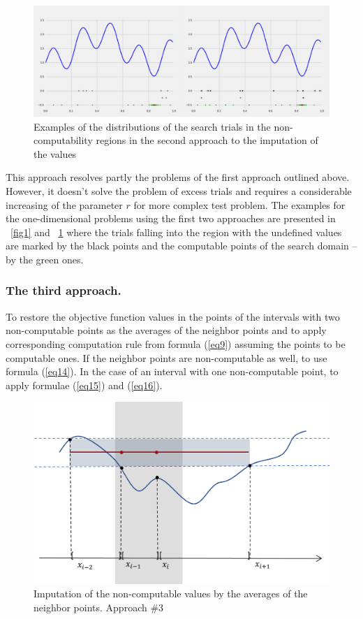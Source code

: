 \documentclass[runningheads]{llncs}
\begin{document}
\begin{figure}
\includegraphics[width=\textwidth]{fig2.png}
\caption{Examples of the distributions of the search trials in the non-computability regions in the second approach to the imputation of the values} \label{fig2}
\end{figure}

This approach resolves partly the problems of the first approach outlined above. However, it doesn’t solve the problem of excess trials and requires a considerable increasing of the parameter $r$ for more complex test problem. The examples for the one-dimensional problems using the first two approaches are presented in ~\ref{fig1} and ~\ref{fig2} where the trials falling into the region with the undefined values are marked by the black points and the computable points of the search domain – by the green ones. 

\subsubsection{The third approach.} To restore the objective function values in the points of the intervals with two non-computable points as the averages of the neighbor points and to apply corresponding computation rule from formula (\ref{eq9}) assuming the points to be computable ones. If the neighbor points are non-computable as well, to use formula (\ref{eq14}). In the case of an interval with one non-computable point, to apply formulae (\ref{eq15}) and (\ref{eq16}).
\begin{figure}
\includegraphics[width=\textwidth]{fig3.png}
\caption{Imputation of the non-computable values by the averages of the neighbor points. Approach \#3} \label{fig3}
\end{figure}
\end{document}
